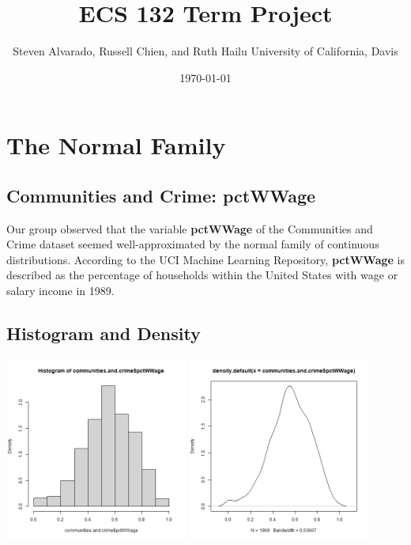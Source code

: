 \documentclass[12pt, letterpaper]{report}
\title{\textbf{ECS 132 Term Project}}
\author{\parbox{\linewidth}{\centering%
  Steven Alvarado, Russell Chien, and Ruth Hailu\endgraf\bigskip
  University of California, Davis}}
\date{\monthyeardate\today}
\begin{document}
\maketitle
\chapter{The Normal Family}
\section{Communities and Crime: pctWWage}

Our group observed that the variable \textbf{pctWWage} of the Communities and Crime dataset seemed well-approximated by the normal family of continuous distributions.
According to the UCI Machine Learning Repository, \textbf{pctWWage} is described as the percentage of households within the United States with wage or salary income in 1989.

\section{Histogram and Density}


\begin{center}
\includegraphics[width=0.45\textwidth]{normal/pctWWage_hist}
\includegraphics[width=0.45\textwidth]{normal/pctWWage_density}
\end{center}
\end{document}
